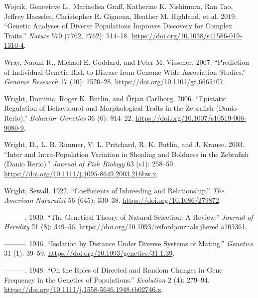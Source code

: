 \documentclass[
]{book}
\newlength{\cslhangindent}
\newlength{\cslentryspacingunit} %
\newenvironment{CSLReferences}[2] %
 {%
  \setlength{\parindent}{0pt}
  \ifodd #1
  \let\oldpar\par
  \def\par{\hangindent=\cslhangindent\oldpar}
  \fi
  \setlength{\parskip}{#2\cslentryspacingunit}
 }%
 {}
\begin{document}
\begin{CSLReferences}{1}{0}
\leavevmode{}%
Wojcik, Genevieve L., Mariaelisa Graff, Katherine K. Nishimura, Ran Tao, Jeffrey Haessler, Christopher R. Gignoux, Heather M. Highland, et al. 2019. {``Genetic Analyses of Diverse Populations Improves Discovery for Complex Traits.''} \emph{Nature} 570 (7762, 7762): 514--18. \url{https://doi.org/10.1038/s41586-019-1310-4}.

\leavevmode{}%
Wray, Naomi R., Michael E. Goddard, and Peter M. Visscher. 2007. {``Prediction of Individual Genetic Risk to Disease from Genome-Wide Association Studies.''} \emph{Genome Research} 17 (10): 1520--28. \url{https://doi.org/10.1101/gr.6665407}.

\leavevmode{}%
Wright, Dominic, Roger K. Butlin, and Örjan Carlborg. 2006. {``Epistatic Regulation of Behavioural and Morphological Traits in the Zebrafish ({Danio} Rerio).''} \emph{Behavior Genetics} 36 (6): 914--22. \url{https://doi.org/10.1007/s10519-006-9080-9}.

\leavevmode{}%
Wright, D., L. B. Rimmer, V. L. Pritchard, R. K. Butlin, and J. Krause. 2003. {``Inter and Intra-Population Variation in Shoaling and Boldness in the Zebrafish ({Danio} Rerio).''} \emph{Journal of Fish Biology} 63 (s1): 258--59. \url{https://doi.org/10.1111/j.1095-8649.2003.216bw.x}.

\leavevmode{}%
Wright, Sewall. 1922. {``Coefficients of {Inbreeding} and {Relationship}.''} \emph{The American Naturalist} 56 (645): 330--38. \url{https://doi.org/10.1086/279872}.

\leavevmode{}%
---------. 1930. {``The {Genetical Theory} of {Natural Selection}: {A Review}.''} \emph{Journal of Heredity} 21 (8): 349--56. \url{https://doi.org/10.1093/oxfordjournals.jhered.a103361}.

\leavevmode{}%
---------. 1946. {``Isolation by {Distance} Under {Diverse Systems} of {Mating}.''} \emph{Genetics} 31 (1): 39--59. \url{https://doi.org/10.1093/genetics/31.1.39}.

\leavevmode{}%
---------. 1948. {``On the {Roles} of {Directed} and {Random Changes} in {Gene Frequency} in the {Genetics} of {Populations}.''} \emph{Evolution} 2 (4): 279--94. \url{https://doi.org/10.1111/j.1558-5646.1948.tb02746.x}.


\end{CSLReferences}
\end{document}

